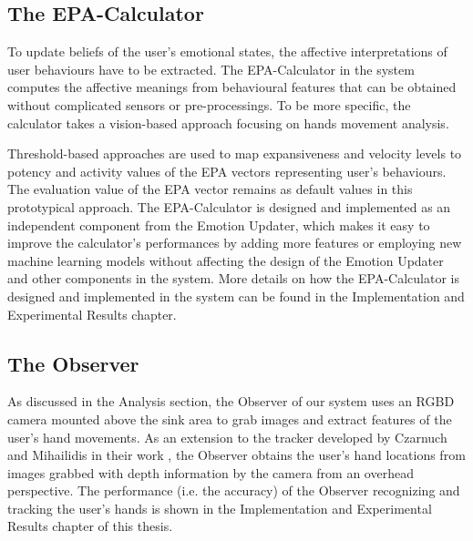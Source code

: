 \subsection{The EPA-Calculator}

To update beliefs of the user's emotional states, the affective interpretations of user behaviours have to be extracted. The EPA-Calculator in the system computes the affective meanings from behavioural features that can be obtained without complicated sensors or pre-processings. To be more specific, the calculator takes a vision-based approach focusing on hands movement analysis.

Threshold-based approaches are used to map expansiveness and velocity levels to potency and activity values of the EPA vectors representing user's behaviours. The evaluation value of the EPA vector remains as default values in this prototypical approach. The EPA-Calculator is designed and implemented as an independent component from the Emotion Updater, which makes it easy to improve the calculator's performances by adding more features or employing new machine learning models without affecting the design of the Emotion Updater and other components in the system. More details on how the EPA-Calculator is designed and implemented in the system can be found in the Implementation and Experimental Results chapter.

\subsection{The Observer}

As discussed in the Analysis section, the Observer of our system uses an RGBD camera mounted above the sink area to grab images and extract features of the user's hand movements. As an extension to the tracker developed by Czarnuch and Mihailidis in their work \cite{czarnuch2014}, the Observer obtains the user's hand locations from images grabbed with depth information by the camera from an overhead perspective. The performance (i.e. the accuracy) of the Observer recognizing and tracking the user's hands is shown in the Implementation and Experimental Results chapter of this thesis. 

